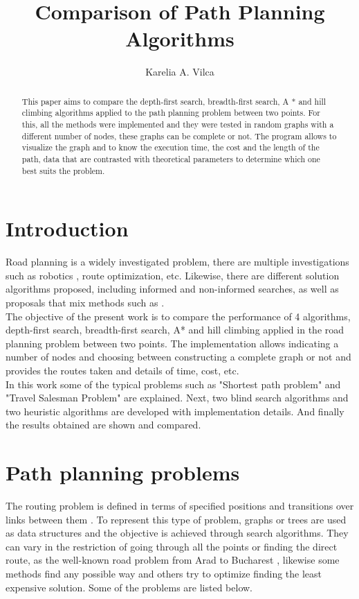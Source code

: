 \documentclass[11pt]{article}
\title{Comparison of Path Planning Algorithms\\ }
\author{Karelia A. Vilca\inst{1}}
\begin{document}
 


\maketitle

\begin{abstract}
This paper aims to compare the depth-first search, breadth-first search, A * and hill climbing algorithms applied to the path planning problem between two points. For this, all the methods were implemented and they were tested in random graphs with a different number of nodes, these graphs can be complete or not. The program allows to visualize the graph and to know the execution time, the cost and the length of the path, data that are contrasted with theoretical parameters to determine which one best suits the problem. 
\end{abstract}
\section{Introduction}
Road planning is a widely investigated problem, there are multiple investigations such as robotics \cite{shwail2013probabilistic}, route optimization, etc. Likewise, there are different solution algorithms proposed, including informed and non-informed searches, as well as proposals that mix methods such as \cite{felner2003kbfs}.\\
The objective of the present work is to compare the performance of 4 algorithms, depth-first search, breadth-first search, A* and hill climbing applied in the road planning problem between two points. The implementation allows indicating a number of nodes and choosing between constructing a complete graph or not and provides the routes taken and details of time, cost, etc.\\
In this work some of the typical problems such as "Shortest path problem" and "Travel Salesman Problem" are explained. Next, two blind search algorithms and two heuristic algorithms are developed with implementation details. And finally the results obtained are shown and compared.

\section{Path planning problems}
The routing problem is defined in terms of specified positions and transitions over links between them \cite{russell2004inteligencia}. 
To represent this type of problem, graphs or trees are used as data structures and the objective is achieved through search algorithms.
They can vary in the restriction of going through all the points or finding the direct route, as the well-known road problem from Arad to Bucharest \cite{russell2004inteligencia}, likewise some methods find any possible way and others try to optimize finding the least expensive solution. Some of the problems are listed below.
\end{document}
